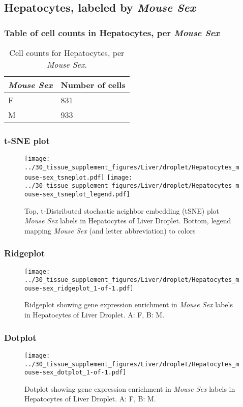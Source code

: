 \clearpage

\subsection{Hepatocytes, labeled by \emph{Mouse Sex}}
\subsubsection{Table of cell counts in Hepatocytes, per \emph{Mouse Sex}}\begin{table}[h]
\centering
\label{my-label}
\begin{tabular}{@{}ll@{}}
\toprule

\emph{Mouse Sex}& Number of cells \\ \midrule
F & 831 \\

M & 933 \\
\bottomrule
\end{tabular}
\caption{Cell counts for Hepatocytes, per \emph{Mouse Sex}.}
\end{table}

\clearpage
\subsubsection{t-SNE plot}
\begin{figure}[h]
\centering
\texttt{[image: ../30\_tissue\_supplement\_figures/Liver/droplet/Hepatocytes\_mouse-sex\_tsneplot.pdf]}
\texttt{[image: ../30\_tissue\_supplement\_figures/Liver/droplet/Hepatocytes\_mouse-sex\_tsneplot\_legend.pdf]}
\caption{Top, t-Distributed stochastic neighbor embedding (tSNE) plot  \emph{Mouse Sex} labels in Hepatocytes of Liver Droplet. Bottom, legend mapping \emph{Mouse Sex} (and letter abbreviation) to colors}
\end{figure}


\clearpage

\subsubsection{Ridgeplot}
\begin{figure}[h]
\centering
\texttt{[image: ../30\_tissue\_supplement\_figures/Liver/droplet/Hepatocytes\_mouse-sex\_ridgeplot\_1-of-1.pdf]}

\caption{ Ridgeplot  showing gene expression enrichment in \emph{Mouse Sex} labels in Hepatocytes of Liver Droplet. A: F, B: M.}
\end{figure}


\clearpage

\subsubsection{Dotplot}
\begin{figure}[h]
\centering
\texttt{[image: ../30\_tissue\_supplement\_figures/Liver/droplet/Hepatocytes\_mouse-sex\_dotplot\_1-of-1.pdf]}

\caption{ Dotplot  showing gene expression enrichment in \emph{Mouse Sex} labels in Hepatocytes of Liver Droplet. A: F, B: M.}
\end{figure}

